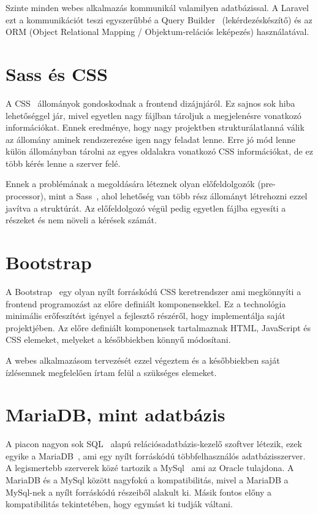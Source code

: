 \documentclass[
]{thesis-ekf}
\theoremstyle{definition}
\theoremstyle{remark}
\begin{document}
Szinte minden webes alkalmazás kommunikál valamilyen adatbázissal. A Laravel ezt a kommunikációt teszi egyszerűbbé a Query Builder~\cite{laravel_querybuilder} (lekérdezéskészítő) és az ORM (Object Relational Mapping / Objektum-relációs leképezés) használatával. 

\section{Sass és CSS}
A CSS~\cite{css_doc} állományok gondoskodnak a frontend dizájnjáról. Ez sajnos sok hiba lehetőséggel jár, mivel egyetlen nagy fájlban tároljuk a megjelenésre vonatkozó információkat. Ennek eredménye, hogy nagy projektben strukturálatlanná válik az állomány aminek rendszerezése igen nagy feladat lenne. Erre jó mód lenne külön állományban tárolni az egyes oldalakra vonatkozó CSS információkat, de ez több kérés lenne a szerver felé. 

Ennek a problémának a megoldására léteznek olyan előfeldolgozók (pre-processor), mint a Sass~\cite{sass_doc}, ahol lehetőség van több rész állományt létrehozni ezzel javítva a struktúrát. Az előfeldolgozó végül pedig egyetlen fájlba egyesíti a részeket és nem növeli a kérések számát. 

\section{Bootstrap}
A Bootstrap~\cite{bootstrap_doc} egy olyan nyílt forráskódú CSS keretrendszer ami megkönnyíti a frontend programozást az előre definiált komponensekkel. Ez a technológia minimális erőfeszítést igényel a fejlesztő részéről, hogy implementálja saját projektjében. Az előre definiált komponensek tartalmaznak HTML, JavaScript és CSS elemeket, melyeket a későbbiekben könnyű módosítani.

A webes alkalmazásom tervezését ezzel végeztem és a későbbiekben saját ízlésemnek megfelelően írtam felül a szükséges elemeket. 

\section{MariaDB, mint adatbázis}
A piacon nagyon sok SQL~\cite{sql_book} alapú relációsadatbázis-kezelő szoftver létezik, ezek egyike a MariaDB~\cite{mariadb_doc}, ami egy nyílt forráskódú többfelhasználós adatbázisszerver. A legismertebb szerverek közé tartozik a MySql~\cite{mysql_book} ami az Oracle tulajdona. A MariaDB és a MySql között nagyfokú a kompatibilitás, mivel a MariaDB a MySql-nek a nyílt forráskódú részeiből alakult ki. Másik fontos előny a kompatibilitás tekintetében, hogy egymást ki tudják váltani.
\end{document}
